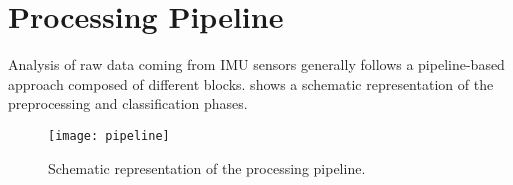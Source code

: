 
\section{Processing Pipeline}
\label{sec:processing_architecture}

Analysis of raw data coming from IMU sensors generally follows a \mbox{pipeline-based} approach composed of different blocks.  shows a schematic representation of the preprocessing and classification phases.

\begin{figure}[h]
	\captionsetup{font=scriptsize, justification=centering}
    \centering
	\texttt{[image: pipeline]}
    \caption{Schematic representation of the processing pipeline.}
    \label{fig:img_pipeline}
\end{figure}

